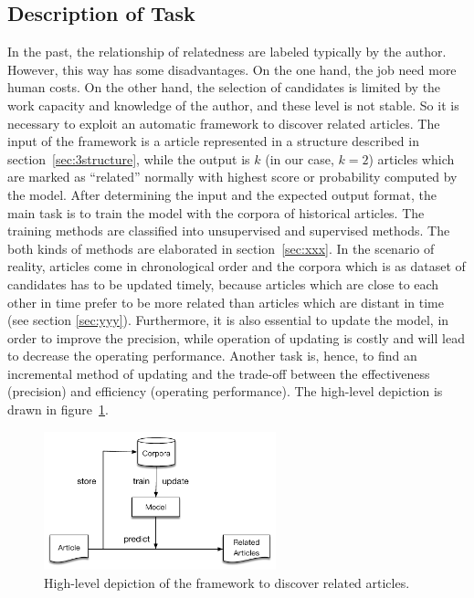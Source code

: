 \subsection{Description of Task}
\label{sec:3.2}

In the past, the relationship of relatedness are labeled typically by the author. However, this way has some disadvantages. On the one hand, the job need more human costs. On the other hand, the selection of candidates is limited by the work capacity and knowledge of the author, and these level is not stable. So it is necessary to exploit an automatic framework to discover related articles. The input of the framework is a article represented in a structure described in section~\ref{sec:3structure}, while the output is $k$ (in our case, $k=2$) articles which are marked as ``related'' normally with highest score or probability computed by the model. After determining the input and the expected output format, the main task is to train the model with the corpora of historical articles. The training methods are classified into unsupervised and supervised methods. The both kinds of methods are elaborated in section~\ref{sec:xxx}. In the scenario of reality, articles come in chronological order and the corpora which is as dataset of candidates has to be updated timely, because articles which are close to each other in time prefer to be more related than articles which are distant in time (see section \ref{sec:yyy}). Furthermore, it is also essential to update the model, in order to improve the precision, while operation of updating is costly and will lead to decrease the operating performance. Another task is, hence, to find an incremental method of updating and the trade-off between the effectiveness (precision) and efficiency (operating performance). The high-level depiction is drawn in figure~\ref{fig:highlevel}. 

\begin{figure}[!htb]
    \centering
    \includegraphics[width=0.6\textwidth]{fig/high-level.pdf}
    \caption{High-level depiction of the framework to discover related articles. }
    \label{fig:highlevel}
\end{figure}


